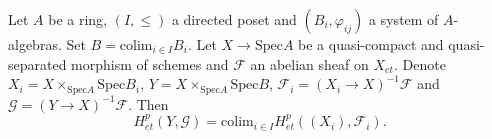 \begin{theorem} \label{thm:directedColimitsAndCohomology}
Let $A$ be a ring, $(I, \leq)$ a directed poset and $(B_i, \varphi_{ij})$ a system of $A$-algebras. Set $B=\text{colim}_{i\in I} B_i$. Let $X \to \text{Spec} A$ be a quasi-compact and quasi-separated morphism of schemes and $\mathcal{F}$ an abelian sheaf on $X_{et}$. Denote $X_i = X\times_{\text{Spec} A} \text{Spec} B_i$,  $Y= X \times_{\text{Spec} A}\text{Spec} B$, $\mathcal{F}_i = (X_i\to X)^{-1}\mathcal{F}$ and $\mathcal{G} = (Y\to X)^{-1}\mathcal{F}$. Then
$$
H_{et}^p(Y, \mathcal{G}) = \text{colim}_{i\in I} H_{et}^p ((X_i), \mathcal{F}_i).
$$
\end{theorem}


